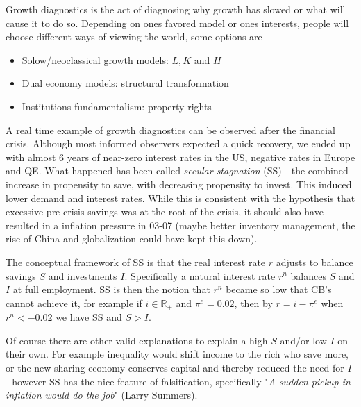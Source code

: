 \documentclass[12pt, a4paper]{article}
\begin{document}
\begin{multicols}{2}
Growth diagnostics is the act of diagnosing why growth has slowed or what will cause it to do so. Depending on ones favored model or ones interests, people will choose different ways of viewing the world, some options are
\begin{itemize}
\item Solow/neoclassical growth models: $L,K$ and $H$
\item Dual economy models: structural transformation
\item Institutions fundamentalism: property rights
\end{itemize}
A real time example of growth diagnostics can be observed after the financial crisis. Although most informed observers expected a quick recovery, we ended up with almost 6 years of near-zero interest rates in the US, negative rates in Europe and QE. What happened has been called \textit{secular stagnation} (SS) - the combined increase in propensity to save, with decreasing propensity to invest. This induced lower demand and interest rates. While this is consistent with the hypothesis that excessive pre-crisis savings was at the root of the crisis, it should also have resulted in a inflation pressure in 03-07 (maybe better inventory management, the rise of China and globalization could have kept this down).

The conceptual framework of SS is that the real interest rate $r$ adjusts to balance savings $S$ and investments $I$. Specifically a natural interest rate $r^n$ balances $S$ and $I$ at full employment. SS is then the notion that $r^n$ became so low that CB's cannot achieve it, for example if $i \in \mathbb{R}_+$ and $\pi^e = 0.02$, then by $r=i-\pi^e$ when $r^n < -0.02$ we have SS and $S>I$.

Of course there are other valid explanations to explain a high $S$ and/or low $I$ on their own. For example inequality would shift income to the rich who save more, or the new sharing-economy conserves capital and thereby reduced the need for $I$ - however SS has the nice feature of falsification, specifically "\textit{A sudden pickup in inflation would do the job}" (Larry Summers).


\end{multicols}
\end{document}
